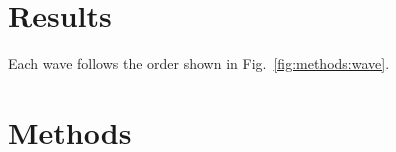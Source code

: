 \documentclass[11pt]{article}
\begin{document}
\section{Results}
Each wave follows the order shown in Fig.~\ref{fig:methods:wave}.

\section{Methods}

\end{document}
